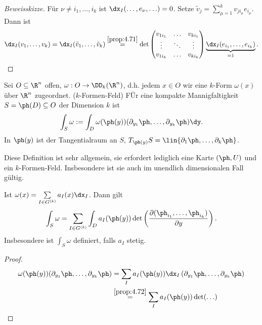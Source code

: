 \begin{proof}[Beweisskizze]
Für $\nu\neq i_1,\ldots,i_k$ ist $\dx_I(\ldots,e_\nu,\ldots) = 0$. Setze
$\tilde{v}_j = \sum\limits_{\mu=1}^k v_{ji_\mu}e_{i_\mu}$.
Dann ist
\begin{align*}
\dx_I(v_1,\ldots,v_k) = \dx_I(\tilde{v}_1,\ldots,\tilde{v}_k)
\overset{\ref{prop:4.71}}{=} \det\begin{pmatrix}
v_{1i_1} & \ldots & v_{ki_1}\\
\vdots & \ddots & \vdots\\
v_{1i_k} & \ldots & v_{ki_k}
\end{pmatrix}\underbrace{\dx_I(e_{i_1},\ldots,e_{i_k})}_{=1}.
\end{align*}
\end{proof}

\begin{defn}
\label{defn:4.73}
Sei $O\subseteq\R^n$ offen, $\omega: O\to\DD_k(\R^n)$, d.h. jedem $x\in O$ wir
eine $k$-Form $\omega(x)$ über $\R^n$ zugeordnet. ($k$-Formen-Feld) FÜr eine
kompakte Mannigfaltigkeit $S=\ph(D)\subseteq O$ der Dimension $k$ ist
\begin{align*}
\int_S \omega := \int_D
\omega(\ph(y))(\partial_{y_1}\ph,\ldots,\partial_{y_k}\ph)\dy.
\end{align*}
In $\ph(y)$ ist der Tangentialraum an $S$, $T_{\ph(y)}S =
\lin{\partial_1\ph,\ldots,\partial_k \ph}$.
\end{defn}

\begin{bem}
\label{bem:4.74}
Diese Definition ist sehr allgemein, sie erfordert lediglich eine Karte
$(\ph,U)$ und ein $k$-Formen-Feld. Insbesondere ist sie auch im unendlich
dimensionalen Fall gültig.\maphere
\end{bem}

\begin{cor}
\label{prop:4.75}
Ist $\omega(x) = \sum\limits_{I\in G^{(k)}} a_I(x)\dx_I$. Dann gilt
\begin{align*}
\int_S \omega = \sum\limits_{I\in G^{(k)}}\int_D a_I(\ph(y))
\det\left(\frac{\partial(\ph_{i_1},\ldots,\ph_{i_k})}{\partial y} \right).
\end{align*}
Insbesondere ist $\int_S \omega$ definiert, falls $a_I$ stetig.\fishhere
\end{cor}
\begin{proof}
\begin{align*}
\omega(\ph(y))(\partial_{y_1}\ph,\ldots,\partial_{y_k}\ph) &= 
\sum\limits_{I} a_I(\ph(y))
\dx_I\left(\partial_{y_1}\ph,\ldots,\partial_{y_k}\ph\right)\\
&\overset{\ref{prop:4.72}}{=} \sum\limits_{I} a_I(\ph(y))
\det(\ldots)\qedhere
\end{align*}
\end{proof}

